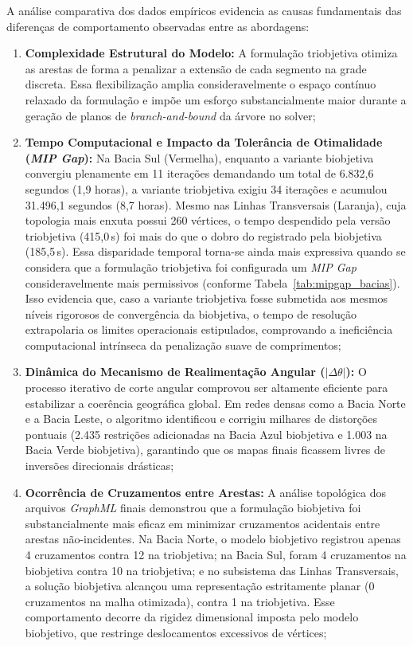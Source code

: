 \documentclass[cic,tc]{infufrgs}
\begin{document}
A análise comparativa dos dados empíricos evidencia as causas fundamentais das diferenças de comportamento observadas entre as abordagens:

\begin{enumerate}
    \item \textbf{Complexidade Estrutural do Modelo:} A formulação triobjetiva otimiza as arestas de forma a penalizar a extensão de cada segmento na grade discreta. Essa flexibilização amplia consideravelmente o espaço contínuo relaxado da formulação e impõe um esforço substancialmente maior durante a geração de planos de \textit{branch-and-bound} da árvore no solver;
    \item \textbf{Tempo Computacional e Impacto da Tolerância de Otimalidade (\textit{MIP Gap}):} Na Bacia Sul (Vermelha), enquanto a variante biobjetiva convergiu plenamente em 11 iterações demandando um total de 6.832{,}6 segundos (1,9 horas), a variante triobjetiva exigiu 34 iterações e acumulou 31.496{,}1 segundos (8,7 horas). Mesmo nas Linhas Transversais (Laranja), cuja topologia mais enxuta possui 260 vértices, o tempo despendido pela versão triobjetiva (415{,}0\,s) foi mais do que o dobro do registrado pela biobjetiva (185{,}5\,s). Essa disparidade temporal torna-se ainda mais expressiva quando se considera que a formulação triobjetiva foi configurada um \textit{MIP Gap} consideravelmente mais permissivos (conforme Tabela~\ref{tab:mipgap_bacias}). Isso evidencia que, caso a variante triobjetiva fosse submetida aos mesmos níveis rigorosos de convergência da biobjetiva, o tempo de resolução extrapolaria os limites operacionais estipulados, comprovando a ineficiência computacional intrínseca da penalização suave de comprimentos;
    \item \textbf{Dinâmica do Mecanismo de Realimentação Angular ($|\Delta\theta|$):} O processo iterativo de corte angular comprovou ser altamente eficiente para estabilizar a coerência geográfica global. Em redes densas como a Bacia Norte e a Bacia Leste, o algoritmo identificou e corrigiu milhares de distorções pontuais (2.435 restrições adicionadas na Bacia Azul biobjetiva e 1.003 na Bacia Verde biobjetiva), garantindo que os mapas finais ficassem livres de inversões direcionais drásticas;
    \item \textbf{Ocorrência de Cruzamentos entre Arestas:} A análise topológica dos arquivos \textit{GraphML} finais demonstrou que a formulação biobjetiva foi substancialmente mais eficaz em minimizar cruzamentos acidentais entre arestas não-incidentes. Na Bacia Norte, o modelo biobjetivo registrou apenas 4 cruzamentos contra 12 na triobjetiva; na Bacia Sul, foram 4 cruzamentos na biobjetiva contra 10 na triobjetiva; e no subsistema das Linhas Transversais, a solução biobjetiva alcançou uma representação estritamente planar (0 cruzamentos na malha otimizada), contra 1 na triobjetiva. Esse comportamento decorre da rigidez dimensional imposta pelo modelo biobjetivo, que restringe deslocamentos excessivos de vértices;

\end{enumerate}
\end{document}
